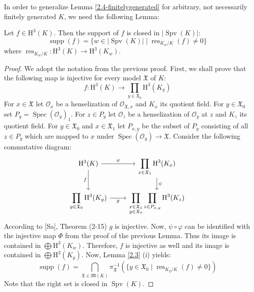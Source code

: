 In order to generalize Lemma \ref{2.4-finitelygenerated} for arbitrary, not necessarily finitely generated $K$, we need the following Lemma:

\begin{lemma}\label{2.4-closedset}
Let $f\in\mathrm{H}^3(K)$. Then the support of $f$ is closed in $|\operatorname{Spv}(K)|$:
\[ \operatorname{supp}(f) = \{w\in |\operatorname{Spv}(K)|\mid \operatorname{res}_{K_w/K}(f)\neq 0 \} \]
where $\operatorname{res}_{K_w/K}: \mathrm{H}^3(K)\to \mathrm{H}^3(K_w)$.
\end{lemma}

\begin{proof}
We adopt the notation from the previous proof. First, we shall prove that the following map is injective for every model $\mathfrak{X}$ of $K$:
\[ f: \mathrm{H}^3(K) \longrightarrow \prod_{y\in\mathfrak{X}_0}\mathrm{H}^3(K_y) \]
For $x\in\mathfrak{X}$ let $\mathcal{O}_x$ be a henselization of $\mathcal{O}_{\mathfrak{X}, x}$ and $K_x$ its quotient field. For $y\in\mathfrak{X}_0$ set $P_y=\operatorname{Spec}(\mathcal{O}_y)_1$. For $z\in P_y$ let $\mathcal{O}_z$ be a henselization of $\mathcal{O}_y$ at $z$ and $K_z$ its quotient field. For $y\in\mathfrak{X}_0$ and $x\in\mathfrak{X}_1$ let $P_{x,y}$ be the subset of $P_y$ consisting of all $z\in P_y$ which are mapped to $x$ under $\operatorname{Spec}(\mathcal{O}_y)\to\mathfrak{X}$. Consider the following commutative diagram:
\[ \begin{tikzcd}
\mathrm{H}^3(K)\ar[r, "\varphi"]\ar[d, "f"'] & \displaystyle\prod_{x\in\mathfrak{X}_1}\mathrm{H}^3(K_x)\ar[d, "\psi"]\\
\displaystyle\prod_{y\in\mathfrak{X}_0}\mathrm{H}^3(K_y) \ar[r, "g"']& \displaystyle\prod_{\substack{x\in\mathfrak{X}_1 \\ y\in\mathfrak{X}_0}}\prod_{z\in P_{x,y}}\mathrm{H}^3(K_z)
\end{tikzcd} \]
According to [Sa], Theorem (2-15) $g$ is injective. Now, $\psi\circ\varphi$ can be identified with the injective map $\Phi$ from the proof of the previous Lemma. Thus its image is contained in $\bigoplus\mathrm{H}^3(K_w)$. Therefore, $f$ is injective as well and its image is contained in $\bigoplus\mathrm{H}^3(K_y)$. Now, Lemma \ref{2.3} (i) yields:
\[ \operatorname{supp}(f) = \bigcap_{\mathfrak{X}\in \mathfrak{M}(K)} \pi_\mathfrak{X}^{-1}(\{ y\in\mathfrak{X}_0\mid \operatorname{res}_{K_y/K}(f)\neq 0 \}) \]
Note that the right set is closed in $\operatorname{Spv}(K)$.
\end{proof}

